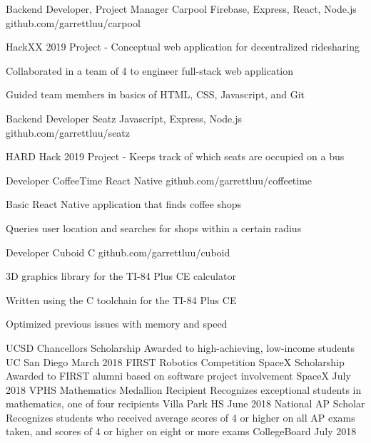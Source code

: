 \documentclass[]{awesome-cv}
\begin{document}
\vspace{-9mm}
\begin{cventries}

	\cventry
  {Backend Developer, Project Manager}
  {Carpool}
	{Firebase, Express, React, Node.js}
	{github.com/garrettluu/carpool}
  {\begin{cvitems}
    \item{HackXX 2019 Project - Conceptual web application for decentralized ridesharing}
    \item{Collaborated in a team of 4 to engineer full-stack web application}
    \item{Guided team members in basics of HTML, CSS, Javascript, and Git}
    \end{cvitems}}

	\vspace{-5mm}
	\cventry
  {Backend Developer}
	{Seatz}
	{Javascript, Express, Node.js}
	{github.com/garrettluu/seatz}
  {\begin{cvitems}
    \item{HARD Hack 2019 Project - Keeps track of which seats are occupied on a bus}
    \end{cvitems}}

	\vspace{-5mm}
	\cventry
  {Developer}
  {CoffeeTime}
  {React Native}
	{github.com/garrettluu/coffeetime}
  {\begin{cvitems}
    \item{Basic React Native application that finds coffee shops}
    \item{Queries user location and searches for shops within a certain radius}
    \end{cvitems}}

	\vspace{-5mm}
	\cventry
  {Developer}
	{Cuboid}
	{C}
	{github.com/garrettluu/cuboid}
  {\begin{cvitems}
	  \item{3D graphics library for the TI-84 Plus CE calculator}
    \item{Written using the C toolchain for the TI-84 Plus CE}
    \item{Optimized previous issues with memory and speed}
    \end{cvitems}}

\end{cventries}

\vspace{-5mm}
\begin{cvhonors}
	\cvhonor
	{UCSD Chancellor\textquotesingle{}s Scholarship}
	{Awarded to high-achieving, low-income students}
	{UC San Diego}
	{March 2018}
	\cvhonor
	{FIRST Robotics Competition SpaceX Scholarship}
	{Awarded to FIRST alumni based on software project involvement}
	{SpaceX}
	{July 2018}
	\cvhonor
	{VPHS Mathematics Medallion Recipient}
	{Recognizes exceptional students in mathematics, one of four recipients}
	{Villa Park HS}
	{June 2018}
	\cvhonor
	{National AP Scholar}
	{Recognizes students who received average scores of 4 or higher on all AP
    exams taken, and scores of 4 or higher on eight or more exams}
	{CollegeBoard}
	{July 2018}
\end{cvhonors}
\end{document}
